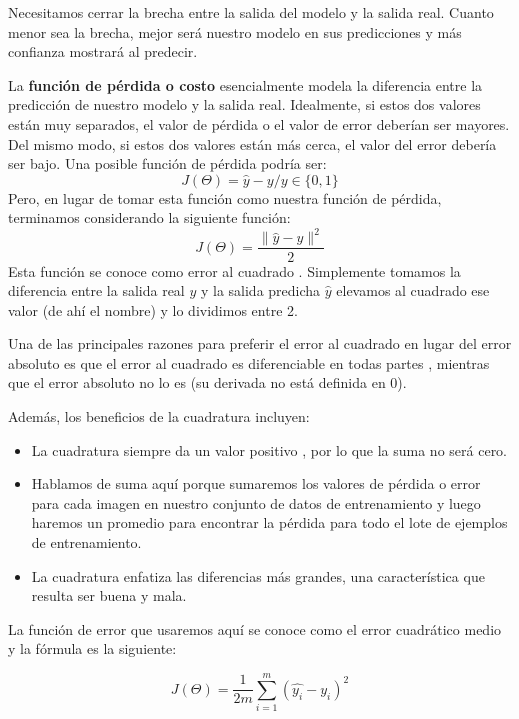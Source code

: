 \documentclass[14.5pt,a4paper]{article}
\begin{document}
Necesitamos cerrar la brecha entre la salida del modelo y la salida real. Cuanto menor sea la brecha, mejor será nuestro modelo en sus predicciones y más confianza mostrará al predecir.

La \textbf{función de pérdida o costo} esencialmente modela la diferencia entre la predicción de nuestro modelo y la salida real. Idealmente, si estos dos valores están muy separados, el valor de pérdida o el valor de error deberían ser mayores. Del mismo modo, si estos dos valores están más cerca, el valor del error debería ser bajo.
Una posible función de pérdida podría ser:
\begin{equation}
J(\Theta)=\hat{y}-y / y\in\{0,1\}
\end{equation}
Pero, en lugar de tomar esta función como nuestra función de pérdida, terminamos considerando la siguiente función:
\begin{equation}
J(\Theta)=\frac{\|\hat{y}-y\|^2}{2}
\end{equation}
Esta función se conoce como error al cuadrado . Simplemente tomamos la diferencia entre la salida real $y$ y la salida predicha $\hat{y}$ elevamos al cuadrado ese valor (de ahí el nombre) y lo dividimos entre 2.

Una de las principales razones para preferir el error al cuadrado en lugar del error absoluto es que el error al cuadrado es diferenciable en todas partes , mientras que el error absoluto no lo es (su derivada no está definida en 0).

Además, los beneficios de la cuadratura incluyen:
\begin{itemize}


\item La cuadratura siempre da un valor positivo , por lo que la suma no será cero.
\item Hablamos de suma aquí porque sumaremos los valores de pérdida o error para cada imagen en nuestro conjunto de datos de entrenamiento y luego haremos un promedio para encontrar la pérdida para todo el lote de ejemplos de entrenamiento.
\item La cuadratura enfatiza las diferencias más grandes, una característica que resulta ser buena y mala.

\end{itemize}

La función de error que usaremos aquí se conoce como el error cuadrático medio y la fórmula es la siguiente:

\begin{equation}
J(\Theta)=\frac{1}{2m} \sum_{i=1}^{m} (\hat{y_i}-y_i)^2
\label{funcperdida}
\end{equation}
\end{document}
